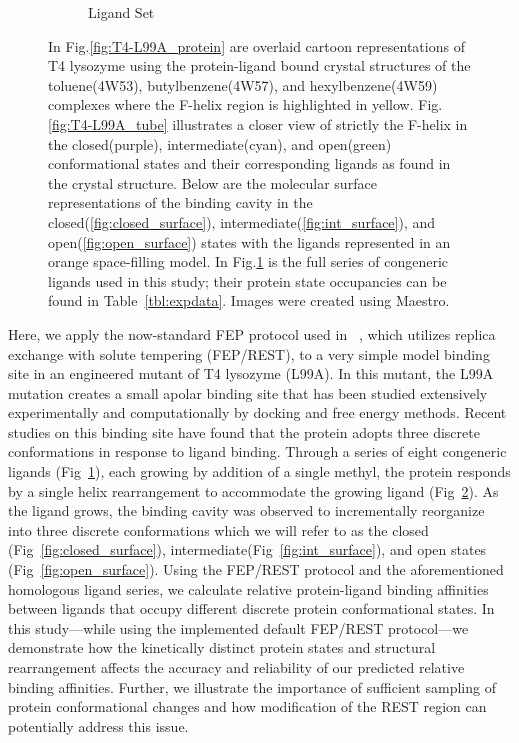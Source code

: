 \begin{figure}[H]
\begin{subfigure}{0.75\textwidth}
   \caption{Ligand Set}
   \label{fig:ligand_set}
\end{subfigure}\hfill
\caption{In Fig.\ref{fig:T4-L99A_protein} are overlaid cartoon representations of T4 lysozyme using the protein-ligand bound crystal structures of the toluene(4W53), butylbenzene(4W57), and hexylbenzene(4W59) complexes where the F-helix region is highlighted in yellow.
Fig.\ref{fig:T4-L99A_tube} illustrates a closer view of strictly the F-helix in the closed(purple), intermediate(cyan), and open(green) conformational states and their corresponding ligands as found in the crystal structure.
Below are the molecular surface representations of the binding cavity in the closed(\ref{fig:closed_surface}), intermediate(\ref{fig:int_surface}), and open(\ref{fig:open_surface}) states with the ligands represented in an orange space-filling model.
In Fig.\ref{fig:ligand_set} is the full series of congeneric ligands used in this study; their protein state occupancies can be found in Table~\ref{tbl:expdata}.
Images were created using Maestro\cite{Maestro}.}
\label{fig:T4-L99A}
\end{figure}

Here, we apply the now-standard FEP protocol used in ~\cite{FEPplus}, which utilizes replica exchange with solute tempering (FEP/REST)\cite{FEP/REST}, to a very simple model binding site in an engineered mutant of T4 lysozyme (L99A).
In this mutant, the L99A mutation creates a small apolar binding site that has been studied extensively experimentally\cite{eriksson1992response,eriksson1993similar,T4affinity,doi:10.1021/bi00027a007} and computationally by docking\cite{wei2002model,wei2004testing,graves2005decoys,Merski2015} and free energy methods\cite{Mobley20071118,hermans1997inclusion,boresch2003absolute,deng2006calculation,mann2000modeling,Boyce2009,FEP/REST,FEP/RESTapp}.
Recent studies on this binding site have found that the protein adopts three discrete conformations in response to ligand binding\cite{Merski2015}.
Through a series of eight congeneric ligands (Fig~\ref{fig:ligand_set}), each growing by addition of a single methyl, the protein responds by a single helix rearrangement to accommodate the growing ligand (Fig~\ref{fig:T4-L99A}).
As the ligand grows, the binding cavity was observed to incrementally reorganize into three discrete conformations which we will refer to as the closed (Fig~\ref{fig:closed_surface}), intermediate(Fig~\ref{fig:int_surface}), and open states (Fig~\ref{fig:open_surface}).
Using the FEP/REST protocol and the aforementioned homologous ligand series, we calculate relative protein-ligand binding affinities between ligands that occupy different discrete protein conformational states.
In this study---while using the implemented default FEP/REST protocol---we demonstrate how the kinetically distinct protein states and structural rearrangement affects the accuracy and reliability of our predicted relative binding affinities.
Further, we illustrate the importance of sufficient sampling of protein conformational changes and how modification of the REST region can potentially address this issue.

